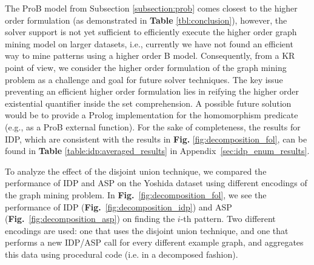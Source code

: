 The ProB model from Subsection \ref{subsection:prob} comes closest to the higher order formulation (as demonstrated in \textbf{Table} \ref{tbl:conclusion}), however, the solver support is not yet sufficient to efficiently execute the higher order graph mining model on larger datasets, i.e., currently we have not found an efficient way to mine patterns using a higher order B model. 
Consequently, from a KR point of view, we consider the higher order formulation of the graph mining problem as a challenge and goal for future solver techniques.
The key issue preventing an efficient higher order formulation lies in reifying the higher order existential quantifier inside the set comprehension. A possible future solution would be to provide a Prolog implementation for the homomorphism predicate (e.g., as a ProB external function).
For the sake of completeness, the results for IDP, which are consistent with the results in \textbf{Fig.} \ref{fig:decomposition_fol}, can be found in \textbf{Table} \ref{table:idp:averaged_results} in Appendix~\ref{sec:idp_enum_results}.

To analyze the effect of the disjoint union technique, we compared the performance of IDP and ASP on the Yoshida dataset using different encodings of the graph mining problem.
In \textbf{Fig.}~\ref{fig:decomposition_fol}, we see the performance of IDP (\textbf{Fig.}~\ref{fig:decomposition_idp}) and ASP (\textbf{Fig.}~\ref{fig:decomposition_asp}) on finding the $i$-th pattern.
Two different encodings are used: one that uses the disjoint union technique, and one that performs a new IDP/ASP call for every different example graph, and aggregates this data using procedural code (i.e. in a decomposed fashion).

